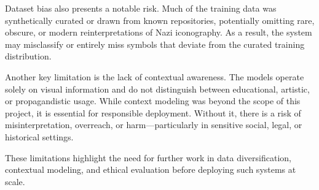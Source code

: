 Dataset bias also presents a notable risk. Much of the training data was synthetically curated or drawn from known
repositories, potentially omitting rare, obscure, or modern reinterpretations of Nazi iconography. As a result, the
system may misclassify or entirely miss symbols that deviate from the curated training distribution.

Another key limitation is the lack of contextual awareness. The models operate solely on visual information and do not
distinguish between educational, artistic, or propagandistic usage. While context modeling was beyond the scope of
this project, it is essential for responsible deployment. Without it, there is a risk of misinterpretation, overreach,
or harm—particularly in sensitive social, legal, or historical settings.

These limitations highlight the need for further work in data diversification, contextual modeling, and ethical
evaluation before deploying such systems at scale.
